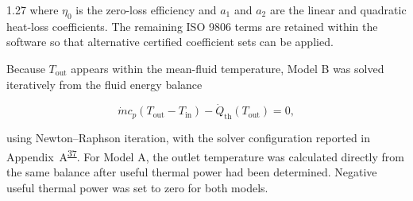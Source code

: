 \documentclass[12pt,letterpaper]{article}
\DeclareRobustCommand{\citenum}[1]{\hyperlink{ref:#1}{#1}} %
\begin{document}
\begin{spacing}{1.27}
\noindent where $\eta_0$ is the zero-loss efficiency and $a_1$ and $a_2$ are the linear and quadratic heat-loss coefficients. The remaining ISO 9806 terms are retained within the software so that alternative certified coefficient sets can be applied.\par

\vspace{0.15in}

Because $T_{\mathrm{out}}$ appears within the mean-fluid temperature, Model B was solved iteratively from the fluid energy balance

\begin{equation}
\dot{m}c_p\left(T_{\mathrm{out}}-T_{\mathrm{in}}\right) - \dot{Q}_{\mathrm{th}}\left(T_{\mathrm{out}}\right) = 0,
\label{eq:energybalance}
\end{equation}

\noindent using Newton--Raphson iteration, with the solver configuration reported in Appendix~A\textsuperscript{\citenum{37}}. For Model A, the outlet temperature was calculated directly from the same balance after useful thermal power had been determined. Negative useful thermal power was set to zero for both models.\par

\begin{figure}[!htb]
\centering
{}
\end{figure}
\end{spacing}
\end{document}
